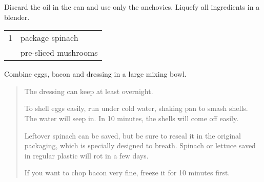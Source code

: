 \begin{multicols*}{3}
Discard the oil in the can and use only the anchovies. Liquefy all  ingredients in a blender.

\begin{tabular}{r@{ }l}
    1 & package spinach \\
      & pre-sliced mushrooms \\
\end{tabular}

Combine eggs, bacon and dressing in a large mixing bowl.

\begin{quote}
The dressing can keep at least overnight.

To shell eggs easily, run under cold water, shaking pan to smash shells. The water will seep in. In 10 minutes, the shells will come off easily.

Leftover spinach can be saved, but be sure to reseal it in the original packaging, which is specially designed to breath. Spinach or lettuce saved in regular plastic will rot in a few days.

If you want to chop bacon very fine, freeze it for 10 minutes first.
\end{quote}

\end{multicols*}

\clearpage
